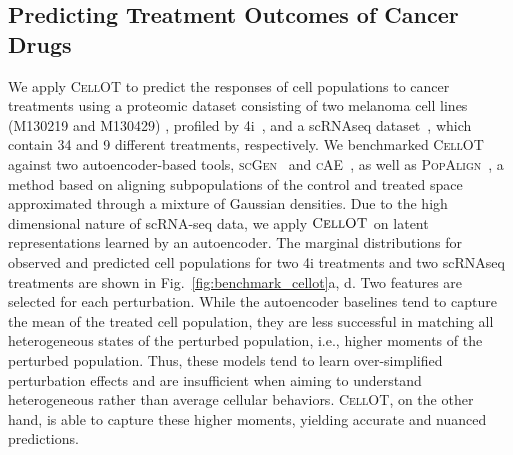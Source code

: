 \subsection{Predicting Treatment Outcomes of Cancer Drugs}

 We apply \textsc{CellOT} to predict the responses of cell populations to cancer treatments using a proteomic dataset consisting of two melanoma cell lines (M130219 and M130429) \citep{raaijmakers2015new}, profiled by 4i~\citep{gut2018multiplexed}, and a scRNAseq dataset~\citep{srivatsan2020massively}, which contain 34 and 9 different treatments, respectively.
We benchmarked \textsc{CellOT} against two autoencoder-based tools, \textsc{scGen}~\citep{lotfollahi2019scgen} and \textsc{cAE}~\citep{Lopez2018scvi}, as well as \textsc{PopAlign}~\citep{chen2020dissecting}, a method based on aligning subpopulations of the control and treated space approximated through a mixture of Gaussian densities.
Due to the high dimensional nature of scRNA-seq data, we apply $\textsc{CellOT}$ on latent representations learned by an autoencoder.
The marginal distributions for observed and predicted cell populations for two 4i treatments and two scRNAseq treatments are shown in Fig.~\ref{fig:benchmark_cellot}a, d. 
Two features are selected for each perturbation.
While the autoencoder baselines tend to capture the mean of the treated cell population, they are less successful in matching all heterogeneous states of the perturbed population, i.e., higher moments of the perturbed population.
Thus, these models tend to learn over-simplified perturbation effects and are insufficient when aiming to understand heterogeneous rather than average cellular behaviors.
\textsc{CellOT}, on the other hand, is able to capture these higher moments, yielding accurate and nuanced predictions.

